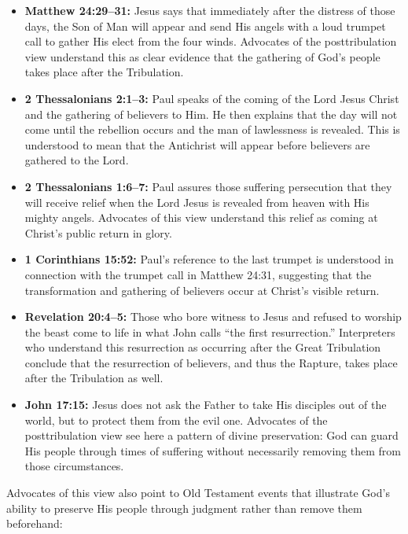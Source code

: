 \begin{itemize}
\item \textbf{Matthew 24:29--31:} Jesus says that immediately after the distress of those days, the Son of Man will appear and send His angels with a loud trumpet call to gather His elect from the four winds. Advocates of the posttribulation view understand this as clear evidence that the gathering of God's people takes place after the Tribulation.
\item \textbf{2 Thessalonians 2:1--3:} Paul speaks of the coming of the Lord Jesus Christ and the gathering of believers to Him. He then explains that the day will not come until the rebellion occurs and the man of lawlessness is revealed. This is understood to mean that the Antichrist will appear before believers are gathered to the Lord.
\item \textbf{2 Thessalonians 1:6--7:} Paul assures those suffering persecution that they will receive relief when the Lord Jesus is revealed from heaven with His mighty angels. Advocates of this view understand this relief as coming at Christ's public return in glory.
\item \textbf{1 Corinthians 15:52:} Paul's reference to the last trumpet is understood in connection with the trumpet call in Matthew 24:31, suggesting that the transformation and gathering of believers occur at Christ's visible return.
\item \textbf{Revelation 20:4--5:} Those who bore witness to Jesus and refused to worship the beast come to life in what John calls ``the first resurrection.'' Interpreters who understand this resurrection as occurring after the Great Tribulation conclude that the resurrection of believers, and thus the Rapture, takes place after the Tribulation as well.
\item \textbf{John 17:15:} Jesus does not ask the Father to take His disciples out of the world, but to protect them from the evil one. Advocates of the posttribulation view see here a pattern of divine preservation: God can guard His people through times of suffering without necessarily removing them from those circumstances.
\end{itemize}

Advocates of this view also point to Old Testament events that illustrate God's ability to preserve His people through judgment rather than remove them beforehand:

